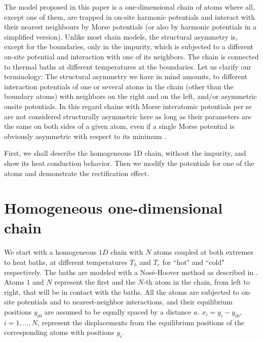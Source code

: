 The model proposed in this paper is a one-dimensional chain of atoms where all, except one of them, are trapped in on-site harmonic potentials and interact with their nearest neighbours by Morse potentials (or also by harmonic
potentials in a simplified version). Unlike most chain models, the structural asymmetry is, except for the boundaries,
only in the impurity, which is subjected to a different on-site potential and interaction with one of its neighbors. The chain is connected to thermal baths at different temperatures at the boundaries.
Let us clarify our terminology:
The structural asymmetry we have in mind amounts,
to different interaction potentials of one or several atoms in the
chain (other than the boundary atoms) with neighbors on the right and on the left, and/or asymmetric onsite potentials. In this regard  chains with Morse interatomic potentials per se are not considered structurally asymmetric here as long as their parameters are the same on both sides of a given atom, even if a single Morse potential is obviously asymmetric with respect to its minimum \cite{Wang2015}.

First, we shall describe the
homogeneous 1D chain, without the impurity,  %
and show its heat conduction behavior.
Then  we modify the potentials for one of the atoms and demonstrate the rectification effect.


\section{Homogeneous one-dimensional chain}

We start with a homogeneous $1D$ chain with $N$ atoms coupled at both extremes to heat baths, at different temperatures $T_h$ and $T_c$ for ``hot" and ``cold" respectively. The baths are modeled with a Nos\' e-Hoover method as described in \cite{Martyna1992}.
Atoms $1$ and $N$ represent the first and the $N$-th atom in the chain, from left to right,
that will be in contact with the baths. All the atoms are subjected to on-site potentials and to nearest-neighbor interactions, and their equilibrium positions $y_{i0}$ are assumed to be equally spaced by a distance $a$.
$x_i= y_i-y_{i0}$,
$i=1,...,N$, represent the displacements from the equilibrium positions of the corresponding atoms
with positions $y_i$.

